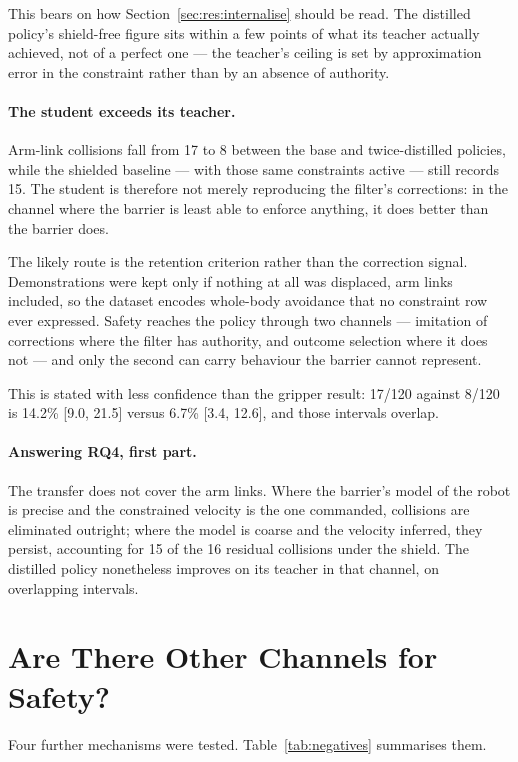 \documentclass[a4paper,11pt]{report}
\begin{document}
This bears on how Section~\ref{sec:res:internalise} should be read. The distilled policy's
shield-free figure sits within a few points of what its teacher actually achieved, not of a
perfect one --- the teacher's ceiling is set by approximation error in the constraint rather than
by an absence of authority.

\paragraph{The student exceeds its teacher.}
Arm-link collisions fall from 17 to 8 between the base and twice-distilled policies, while the
shielded baseline --- with those same constraints active --- still records 15. The student is
therefore not merely reproducing the filter's corrections: in the channel where the barrier is
least able to enforce anything, it does better than the barrier does.

The likely route is the retention criterion rather than the correction signal. Demonstrations
were kept only if nothing at all was displaced, arm links included, so the dataset encodes
whole-body avoidance that no constraint row ever expressed. Safety reaches the policy through
two channels --- imitation of corrections where the filter has authority, and outcome selection
where it does not --- and only the second can carry behaviour the barrier cannot represent.

This is stated with less confidence than the gripper result: 17/120 against 8/120 is
14.2\% [9.0, 21.5] versus 6.7\% [3.4, 12.6], and those intervals overlap.


\paragraph{Answering RQ4, first part.}
The transfer does not cover the arm links. Where the barrier's model of the robot is precise and
the constrained velocity is the one commanded, collisions are eliminated outright; where the model
is coarse and the velocity inferred, they persist, accounting for 15 of the 16 residual collisions
under the shield. The distilled policy nonetheless improves on its teacher in that channel, on
overlapping intervals.

\section{Are There Other Channels for Safety?}\label{sec:res:channels}

Four further mechanisms were tested.
Table~\ref{tab:negatives} summarises them.
\end{document}
